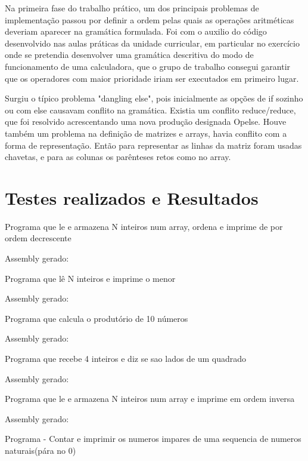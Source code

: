 \documentclass{report}
\begin{document}
Na primeira fase do trabalho prático, um dos principais problemas de implementação passou por definir a ordem pelas quais as operações aritméticas deveriam aparecer na gramática formulada. Foi com o auxilio do código desenvolvido nas aulas práticas da unidade curricular, em particular no exercício onde se pretendia desenvolver uma gramática descritiva do modo de funcionamento de uma calculadora, que o grupo de trabalho consegui garantir que os operadores com maior prioridade iriam ser executados em primeiro lugar.

Surgiu o típico problema "dangling else", pois inicialmente as opções de if sozinho ou com else causavam conflito na gramática.
Existia um conflito reduce/reduce, que foi resolvido acrescentando uma nova produção designada Opelse.
Houve também um problema na definição de matrizes e arrays, havia conflito com a forma de representação. Então para representar as 
linhas da matriz foram usadas chavetas, e para as colunas os parênteses retos como no array.

\section{Testes realizados e Resultados}

Programa que le e armazena N inteiros num array, ordena e imprime de por ordem decrescente


Assembly gerado:



Programa que lê N inteiros e imprime o menor


Assembly gerado:


Programa que calcula o produtório de 10 números


Assembly gerado:


Programa que recebe 4 inteiros e diz se sao lados de um quadrado


Assembly gerado:


Programa que le e armazena N inteiros num array e imprime em ordem inversa


Assembly gerado:


Programa - Contar e imprimir os numeros impares de uma sequencia de numeros naturais(pára no 0)

\end{document}
